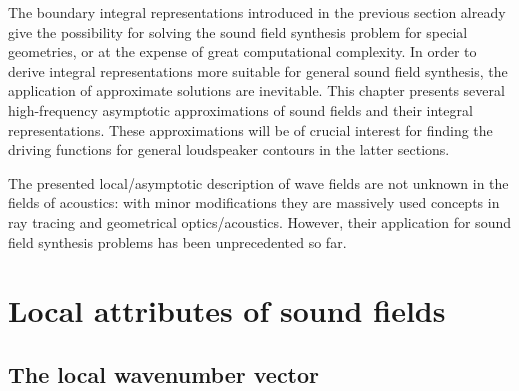 The boundary integral representations introduced in the previous section already give the possibility for solving the sound field synthesis problem for special geometries, or at the expense of great computational complexity.
In order to derive integral representations more suitable for general sound field synthesis, the application of approximate solutions are inevitable.
This chapter presents several high-frequency asymptotic approximations of sound fields and their integral representations.
These approximations will be of crucial interest for finding the driving functions for general loudspeaker contours in the latter sections.


The presented local/asymptotic description of wave fields are not unknown in the fields of acoustics: with minor modifications they are massively used concepts in ray tracing and geometrical optics/acoustics.
However, their application for sound field synthesis problems has been unprecedented so far.

\section{Local attributes of sound fields}
\subsection{The local wavenumber vector}

